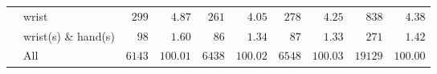 \documentclass[9pt, oneside]{article}   	%
\begin{document}
\begin{longtable}{p{1.8in}p{2.2in}cccccccc}
 & wrist  & $\phantom{0}299$ & $\phantom{00}4.87$ & $\phantom{0}261$ & $\phantom{00}4.05$ & $\phantom{0}278$ & $\phantom{00}4.25$ & $\phantom{00}838$ & $\phantom{00}4.38$ \\
 & wrist(s) \& hand(s)  & $\phantom{00}98$ & $\phantom{00}1.60$ & $\phantom{00}86$ & $\phantom{00}1.34$ & $\phantom{00}87$ & $\phantom{00}1.33$ & $\phantom{00}271$ & $\phantom{00}1.42$ \\
\cline{1-1} \cline{2-2} \cline{3-3} \cline{4-4} \cline{5-5} \cline{6-6} \cline{7-7} \cline{8-8} \cline{9-9} \cline{10-10} %
 & All  & $6143$ & $100.01$ & $6438$ & $100.02$ & $6548$ & $100.03$ & $19129$ & $100.00$ \\
\hline 
\end{longtable}



\pagebreak
\end{document}
